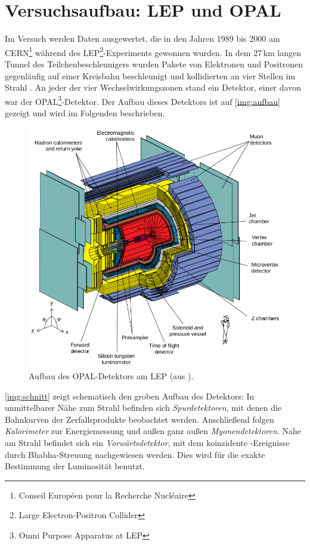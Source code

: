 \section{Versuchsaufbau: LEP und OPAL}
\label{sec:setup}
Im Versuch werden Daten ausgewertet, die in den Jahren 1989 bis 2000 am
CERN\footnote{Conseil Européen pour la Recherche Nucléaire} während des
LEP\footnote{Large Electron-Positron Collider}-Experiments gewonnen wurden.
In dem 27\,km langen Tunnel des Teilchenbeschleunigers wurden Pakete von
Elektronen und Positronen gegenläufig auf einer Kreisbahn beschleunigt
und kollidierten an vier Stellen im Strahl \cite{manual}.
An jeder der vier Wechselwirkungszonen stand ein Detektor, einer davon war der
OPAL\footnote{Omni Purpose Apparatus at LEP}-Detektor.
Der Aufbau dieses Detektors ist auf \autoref{img:aufbau} gezeigt und wird im Folgenden beschrieben.

\begin{figure}[H]
    \begin{center}
        \includegraphics[width=\textwidth]{../img/aufbau.png}
        \caption{Aufbau des OPAL-Detektors am LEP (aus \cite{manualmuc}).}
        \label{img:aufbau}
    \end{center}
\end{figure}

\autoref{img:schnitt} zeigt schematisch den groben Aufbau des Detektors:
In unmittelbarer Nähe zum Strahl befinden sich \emph{Spurdetektoren},
mit denen die Bahnkurven der Zerfallsprodukte beobachtet werden.
Anschließend folgen \emph{Kalorimeter} zur Energiemessung und außen ganz außen \emph{Myonendetektoren}.  
Nahe am Strahl befindet sich ein \emph{Vorwärtsdetektor},
mit dem koinzidente \ee-Ereignisse durch Bhabha-Streuung nachgewiesen
werden. Dies wird für die exakte Bestimmung der Luminosität benutzt.

